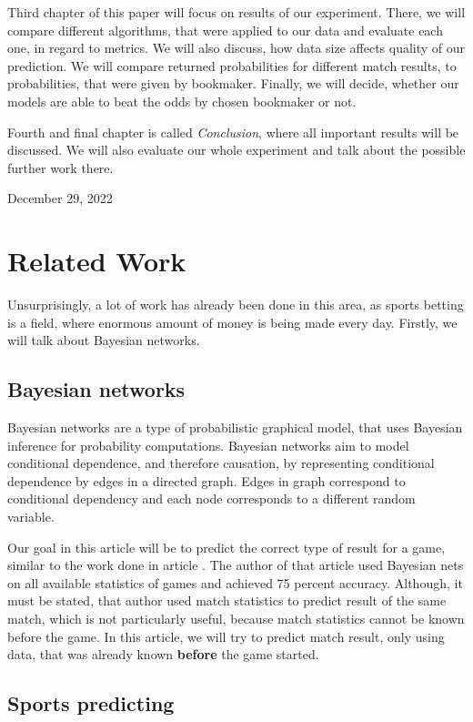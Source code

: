 \documentclass[conference]{IEEEtran}
\begin{document}
Third chapter of this paper will focus on results of our experiment. There, we will compare 
different algorithms, that were applied to our data and evaluate each one, in regard to metrics.
We will also discuss, how data size affects quality of our prediction. We will compare 
returned probabilities for different match results, to probabilities, that were given by
bookmaker. Finally, we will decide, whether our models are able to beat the odds by chosen bookmaker
or not.

Fourth and final chapter is called \emph{Conclusion}, where all important results will be 
discussed. We will also evaluate our whole experiment and talk about the possible further work 
there.
 
\hfill December 29, 2022

\section{Related Work}

Unsurprisingly, a lot of work has already been done in this area, as sports betting is a field,
where enormous amount of money is being made every day. Firstly, we will talk about Bayesian networks.

\subsection{Bayesian networks}

Bayesian networks are a type of probabilistic graphical model, that uses Bayesian 
inference for probability computations. Bayesian networks aim to model conditional 
dependence, and therefore causation, by representing conditional dependence by 
edges in a directed graph. Edges in graph correspond to conditional dependency and 
each node corresponds to a different random variable.

Our goal in this article will be to predict the correct type of result for a game, similar 
to the work done in article \cite{Razali_2017}. The author of that article used Bayesian
nets on all available statistics of games and achieved 75 percent accuracy. Although, it must 
be stated, that author used match statistics to predict result of the same match, which is not
particularly useful, because match statistics cannot be known before the game. In this article,
we will try to predict match result, only using data, that was already known \textbf{before}
the game started.

\subsection{Sports predicting}
\end{document}
